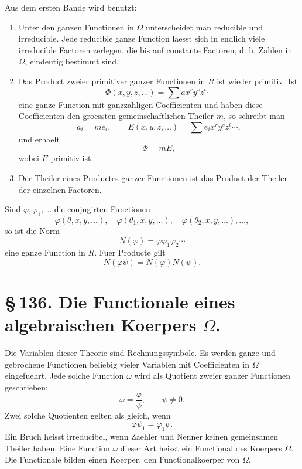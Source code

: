 \documentclass[11pt]{article}
\begin{document}
Aus dem ersten Bande wird benutzt:
\begin{enumerate}[label=\arabic*.]
\item Unter den ganzen Functionen in \(\Omega\) unterscheidet man
reducible und irreducible. Jede reducible ganze Function laesst sich
in endlich viele irreducible Factoren zerlegen, die bis auf constante
Factoren, d. h. Zahlen in \(\Omega\), eindeutig bestimmt sind.

\item Das Product zweier primitiver ganzer Functionen in \(R\) ist
wieder primitiv. Ist
\[
\Phi(x,y,z,\ldots)=\sum a x^r y^s z^t\cdots
\tag{2}
\]
eine ganze Function mit ganzzahligen Coefficienten und haben diese
Coefficienten den groessten gemeinschaftlichen Theiler \(m\), so
schreibt man
\[
a_i=m e_i,\qquad
E(x,y,z,\ldots)=\sum e_i x^r y^s z^t\cdots,
\tag{3}
\]
und erhaelt
\[
\Phi=mE,
\tag{4}
\]
wobei \(E\) primitiv ist.

\item Der Theiler eines Productes ganzer Functionen ist das Product
der Theiler der einzelnen Factoren.
\end{enumerate}

Sind \(\varphi,\varphi_1,\ldots\) die conjugirten Functionen
\[
\varphi(\theta,x,y,\ldots),\quad
\varphi(\theta_1,x,y,\ldots),\quad
\varphi(\theta_2,x,y,\ldots),\ldots ,
\tag{5}
\]
so ist die Norm
\begin{equation}
N(\varphi)=\varphi\varphi_1\varphi_2\cdots
\tag{6}
\end{equation}
eine ganze Function in \(R\). Fuer Producte gilt
\begin{equation}
N(\varphi\psi)=N(\varphi)N(\psi).
\tag{7}
\end{equation}

\section*{\S\,136. Die Functionale eines algebraischen Koerpers \(\Omega\).}

Die Variablen dieser Theorie sind Rechnungssymbole. Es werden ganze
und gebrochene Functionen beliebig vieler Variablen mit Coefficienten
in \(\Omega\) eingefuehrt. Jede solche Function \(\omega\) wird als
Quotient zweier ganzer Functionen geschrieben:
\[
\omega=\frac{\varphi}{\psi},\qquad \psi\neq 0.
\]
Zwei solche Quotienten gelten als gleich, wenn
\[
\varphi\psi_1=\varphi_1\psi.
\]
Ein Bruch heisst irreducibel, wenn Zaehler und Nenner keinen
gemeinsamen Theiler haben. Eine Function \(\omega\) dieser Art heisst
ein Functional des Koerpers \(\Omega\). Die Functionale bilden einen
Koerper, den Functionalkoerper von \(\Omega\).
\end{document}
